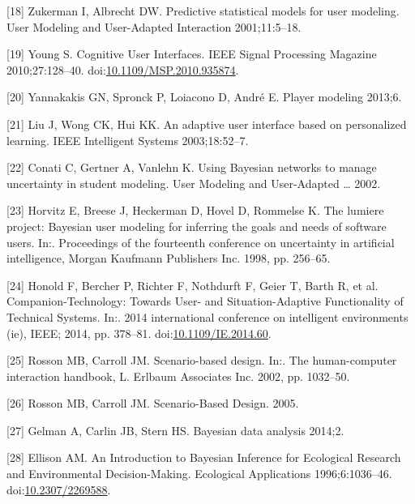 \documentclass[]{article}
\begin{document}
\hypertarget{ref-Anonymous:98QvTtXB}{}
{[}18{]} Zukerman I, Albrecht DW. Predictive statistical models for user
modeling. User Modeling and User-Adapted Interaction 2001;11:5--18.

\hypertarget{ref-Young:2010ck}{}
{[}19{]} Young S. Cognitive User Interfaces. IEEE Signal Processing
Magazine 2010;27:128--40.
doi:\href{https://doi.org/10.1109/MSP.2010.935874}{10.1109/MSP.2010.935874}.

\hypertarget{ref-Anonymous:2013be}{}
{[}20{]} Yannakakis GN, Spronck P, Loiacono D, André E. Player modeling
2013;6.

\hypertarget{ref-Anonymous:tFYXZ8fI}{}
{[}21{]} Liu J, Wong CK, Hui KK. An adaptive user interface based on
personalized learning. IEEE Intelligent Systems 2003;18:52--7.

\hypertarget{ref-Anonymous:rA5_Wtin}{}
{[}22{]} Conati C, Gertner A, Vanlehn K. Using Bayesian networks to
manage uncertainty in student modeling. User Modeling and User-Adapted
\ldots{} 2002.

\hypertarget{ref-Anonymous:6QvxqPLs}{}
{[}23{]} Horvitz E, Breese J, Heckerman D, Hovel D, Rommelse K. The
lumiere project: Bayesian user modeling for inferring the goals and
needs of software users. In:. Proceedings of the fourteenth conference
on uncertainty in artificial intelligence, Morgan Kaufmann Publishers
Inc. 1998, pp. 256--65.

\hypertarget{ref-Honold:2014gq}{}
{[}24{]} Honold F, Bercher P, Richter F, Nothdurft F, Geier T, Barth R,
et al. Companion-Technology: Towards User- and Situation-Adaptive
Functionality of Technical Systems. In:. 2014 international conference
on intelligent environments (ie), IEEE; 2014, pp. 378--81.
doi:\href{https://doi.org/10.1109/IE.2014.60}{10.1109/IE.2014.60}.

\hypertarget{ref-Rosson:2002vj}{}
{[}25{]} Rosson MB, Carroll JM. Scenario-based design. In:. The
human-computer interaction handbook, L. Erlbaum Associates Inc. 2002,
pp. 1032--50.

\hypertarget{ref-Rosson:2005vj}{}
{[}26{]} Rosson MB, Carroll JM. Scenario-Based Design. 2005.

\hypertarget{ref-Andrew:2013un}{}
{[}27{]} Gelman A, Carlin JB, Stern HS. Bayesian data analysis 2014;2.

\hypertarget{ref-Ellison:1996js}{}
{[}28{]} Ellison AM. An Introduction to Bayesian Inference for
Ecological Research and Environmental Decision-Making. Ecological
Applications 1996;6:1036--46.
doi:\href{https://doi.org/10.2307/2269588}{10.2307/2269588}.
\end{document}
